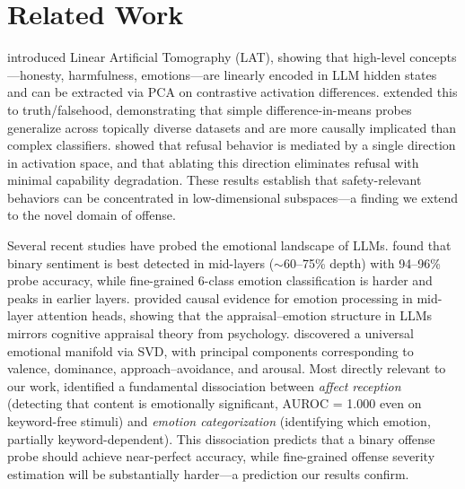 \section{Related Work}
\label{sec:related}

\citet{zou2023representation} introduced Linear Artificial Tomography (LAT), showing that high-level concepts---honesty, harmfulness, emotions---are linearly encoded in LLM hidden states and can be extracted via PCA on contrastive activation differences.
\citet{marks2024geometry} extended this to truth/falsehood, demonstrating that simple difference-in-means probes generalize across topically diverse datasets and are more causally implicated than complex classifiers.
\citet{arditi2024refusal} showed that refusal behavior is mediated by a single direction in activation space, and that ablating this direction eliminates refusal with minimal capability degradation.
These results establish that safety-relevant behaviors can be concentrated in low-dimensional subspaces---a finding we extend to the novel domain of offense.

Several recent studies have probed the emotional landscape of LLMs.
\citet{dipalma2025llamas} found that binary sentiment is best detected in mid-layers ($\sim$60--75\% depth) with 94--96\% probe accuracy, while fine-grained 6-class emotion classification is harder and peaks in earlier layers.
\citet{tak2025mechanistic} provided causal evidence for emotion processing in mid-layer attention heads, showing that the appraisal--emotion structure in LLMs mirrors cognitive appraisal theory from psychology.
\citet{reichman2025emotions} discovered a universal emotional manifold via SVD, with principal components corresponding to valence, dominance, approach--avoidance, and arousal.
Most directly relevant to our work, \citet{keeman2026whether} identified a fundamental dissociation between \emph{affect reception} (detecting that content is emotionally significant, AUROC = 1.000 even on keyword-free stimuli) and \emph{emotion categorization} (identifying which emotion, partially keyword-dependent).
This dissociation predicts that a binary offense probe should achieve near-perfect accuracy, while fine-grained offense severity estimation will be substantially harder---a prediction our results confirm.

